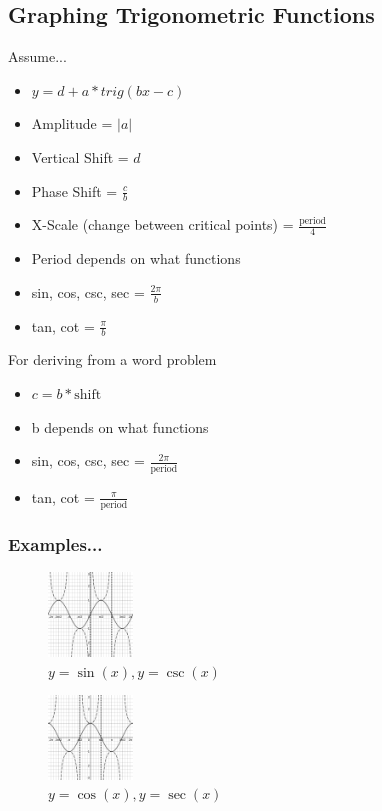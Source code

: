 \documentclass[twocolumn]{article}
\begin{document}
	\subsection*{Graphing Trigonometric Functions}

	Assume...
	\begin{itemize}[label=--]
		\setlength\itemsep{-0.55em}
		\item $ y = d + a * trig(bx - c) $
		\item Amplitude = $ \vert a \vert $
		\item Vertical Shift = $d$
		\item Phase Shift = $ \frac{c}{b} $
		\item X-Scale (change between critical points) = $ \frac{\text{period}}{4} $
		\item Period depends on what functions
		\item sin, cos, csc, sec = $ \frac{2\pi}{b} $
		\item tan, cot = $ \frac{\pi}{b} $
	\end{itemize}
	For deriving from a word problem
	\begin{itemize}[label=--]
		\setlength\itemsep{-0.55em}
		\item $ c = b * \text{shift} $
		\item b depends on what functions
		\item sin, cos, csc, sec = $ \frac{2\pi}{\text{period}} $
		\item tan, cot = $ \frac{\pi}{\text{period}} $
	\end{itemize}
	
	\subsubsection*{Examples...}

	\begin{figure}[H]
		\centering
		\includegraphics[width=0.20\textwidth]{sin-csc.png}
		\caption{$ y = \sin(x), y = \csc(x) $}
	\end{figure}

	\begin{figure}[H]
		\centering
		\includegraphics[width=0.20\textwidth]{cos-sec.png}
		\caption{$ y = \cos(x), y= \sec(x) $}
	\end{figure}
\end{document}
